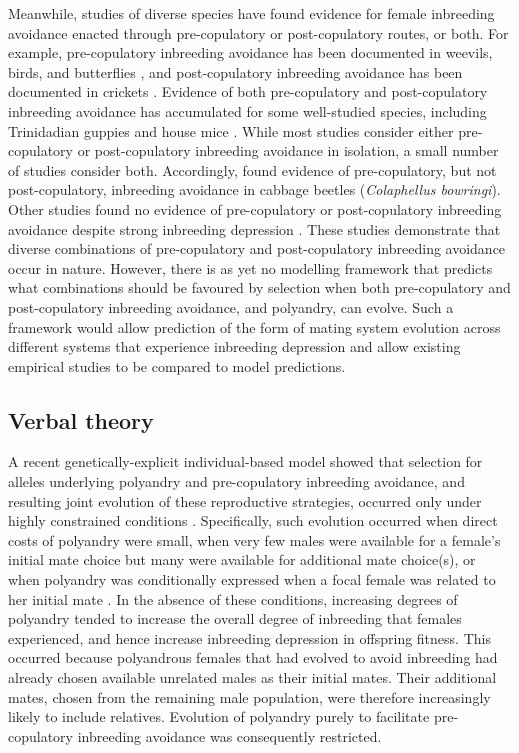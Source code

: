 \documentclass[10pt,letterpaper]{article}
\begin{document}
Meanwhile, studies of diverse species have found evidence for female inbreeding avoidance enacted through pre-copulatory or post-copulatory routes, or both. For example, pre-copulatory inbreeding avoidance has been documented in weevils, birds, and butterflies \cite[e.g.,][]{Kuriwada2011, Kingma2013, Fischer2015}, and post-copulatory inbreeding avoidance has been documented in crickets \cite[e.g.,][]{Simmons2006, Bretman2009}. Evidence of both pre-copulatory and post-copulatory inbreeding avoidance has accumulated for some well-studied species, including Trinidadian guppies \cite[\textit{Poecilia reticulata};][]{Gasparini2011, Daniel2015} and house mice \cite[\textit{Mus domesticus};][]{Potts1991, Firman2015}. While most studies consider either pre-copulatory or post-copulatory inbreeding avoidance in isolation, a small number of studies consider both. Accordingly, \cite{Liu2014} found evidence of pre-copulatory, but not post-copulatory, inbreeding avoidance in cabbage beetles (\textit{Colaphellus bowringi}). Other studies found no evidence of pre-copulatory or post-copulatory inbreeding avoidance despite strong inbreeding depression \cite[e.g.,][]{Reid2014, Reid2015}. These studies demonstrate that diverse combinations of pre-copulatory and post-copulatory inbreeding avoidance occur in nature. However, there is as yet no modelling framework that predicts what combinations should be favoured by selection when both pre-copulatory and post-copulatory inbreeding avoidance, and polyandry, can evolve. Such a framework would allow prediction of the form of mating system evolution across different systems that experience inbreeding depression and allow existing empirical studies to be compared to model predictions.

\subsection*{Verbal theory}

A recent genetically-explicit individual-based model showed that selection for alleles underlying polyandry and pre-copulatory inbreeding avoidance, and resulting joint evolution of these reproductive strategies, occurred only under highly constrained conditions \cite[][]{Duthie}. Specifically, such evolution occurred when direct costs of polyandry were small, when very few males were available for a female's initial mate choice but many were available for additional mate choice(s), or when polyandry was conditionally expressed when a focal female was related to her initial mate \cite[][]{Duthie}. In the absence of these conditions, increasing degrees of polyandry tended to increase the overall degree of inbreeding that females experienced, and hence increase inbreeding depression in offspring fitness. This occurred because polyandrous females that had evolved to avoid inbreeding had already chosen available unrelated males as their initial mates. Their additional mates, chosen from the remaining male population, were therefore increasingly likely to include relatives. Evolution of polyandry purely to facilitate pre-copulatory inbreeding avoidance was consequently restricted.
\end{document}
